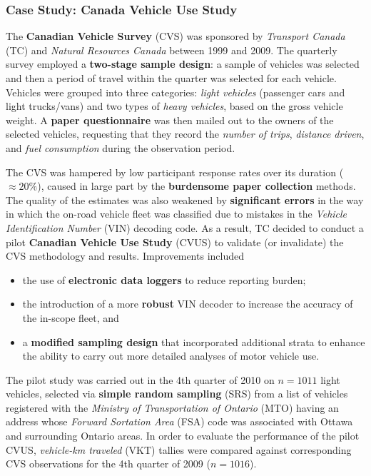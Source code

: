 \subsubsection{Case Study: Canada Vehicle Use Study}
\label{sec:DC_CS}
The \textbf{Canadian Vehicle Survey} (CVS) was sponsored by  \textit{Transport Canada} (TC) and \textit{Natural Resources Canada} between 1999 and 2009. The quarterly survey employed a \textbf{two-stage sample design}: a sample of vehicles was selected and then a period of travel within the quarter was selected for each vehicle. \newl 
Vehicles were grouped into three categories: \textit{light vehicles} (passenger cars and light trucks/vans) and two types of \textit{heavy vehicles}, based on the gross vehicle weight. A \textbf{paper questionnaire} was then mailed out to the owners of the selected vehicles, requesting that they record the \textit{number of trips}, \textit{distance driven}, and \textit{fuel consumption} during the observation period.\par
The CVS was hampered by low participant response rates  over its duration ($\approx 20\%$), caused in large part by the \textbf{burdensome paper collection} methods. The quality of the estimates was also weakened by \textbf{significant errors} in the way in which the on-road vehicle fleet was classified due to mistakes in the \textit{Vehicle Identification Number} (VIN) decoding code.
\newl  As a result, TC decided to conduct a pilot \textbf{Canadian Vehicle Use Study} (CVUS) to validate (or invalidate) the CVS methodology and results. Improvements included 
\begin{itemize}[noitemsep]
\item  the use of \textbf{electronic data loggers} to reduce reporting burden; 
\item the introduction of a more \textbf{robust} VIN decoder to increase the accuracy of the in-scope fleet, and 
\item a \textbf{modified sampling design} that incorporated additional strata to enhance the ability to carry out more detailed analyses of motor vehicle use.
\end{itemize}
The pilot study was carried out in the 4th quarter of 2010 on $n=1011$ light vehicles, selected via \textbf{simple random sampling} (SRS) from a list of vehicles registered with the \textit{Ministry of Transportation of Ontario} (MTO) having an address whose \textit{Forward Sortation Area} (FSA) code was associated with Ottawa and surrounding Ontario areas. \newl In order to evaluate the performance of the pilot CVUS, \textit{vehicle-km traveled} (VKT) tallies were compared against corresponding CVS observations for the 4th quarter of 2009 ($n=1016$). 
